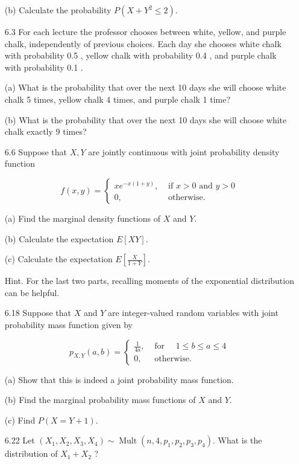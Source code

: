 \documentclass[10pt]{article}
\begin{document}
\begin{itemize}
(b) Calculate the probability $P\left(X+Y^{2} \leq 2\right)$.

\newpage
	\item[6.3] For each lecture the professor chooses between white, yellow, and purple chalk, independently of previous choices. Each day she chooses white chalk with probability 0.5 , yellow chalk with probability 0.4 , and purple chalk with probability 0.1 .

(a) What is the probability that over the next 10 days she will choose white chalk 5 times, yellow chalk 4 times, and purple chalk 1 time?

(b) What is the probability that over the next 10 days she will choose white chalk exactly 9 times?


\newpage
	\item[6.6] Suppose that $X, Y$ are jointly continuous with joint probability density function

$$
f(x, y)= \begin{cases}x e^{-x(1+y)}, & \text { if } x>0 \text { and } y>0 \\ 0, & \text { otherwise. }\end{cases}
$$

(a) Find the marginal density functions of $X$ and $Y$.

(b) Calculate the expectation $E[X Y]$.

(c) Calculate the expectation $E\left[\frac{X}{1+Y}\right]$.

Hint. For the last two parts, recalling moments of the exponential distribution can be helpful.

\newpage
	\item[6.18] Suppose that $X$ and $Y$ are integer-valued random variables with joint probability mass function given by

$$
p_{X, Y}(a, b)= \begin{cases}\frac{1}{4 a}, & \text { for } \quad 1 \leq b \leq a \leq 4 \\ 0, & \text { otherwise. }\end{cases}
$$

(a) Show that this is indeed a joint probability mass function.

(b) Find the marginal probability mass functions of $X$ and $Y$.

(c) Find $P(X=Y+1)$.

\newpage
	\item[6.22] Let $\left(X_{1}, X_{2}, X_{3}, X_{4}\right) \sim \operatorname{Mult}\left(n, 4, p_{1}, p_{2}, p_{3}, p_{4}\right)$. What is the distribution of $X_{1}+X_{2}$ ?


\end{itemize}
\end{document}

